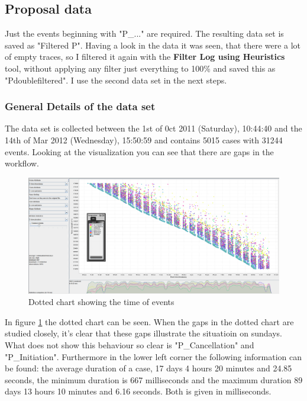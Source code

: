 \subsection{Proposal data}
Just the events beginning with "P\_..." are required. The resulting data set is saved as "Filtered P". Having a look in the data it was seen, that there were a lot of empty traces, so I filtered it again with the \textbf{Filter Log using Heuristics} tool, without applying any filter just everything to 100\% and saved this as "Pdoublefiltered". I use the second data set in the next steps.

\subsubsection{General Details of the data set}
The data set is collected between the 1st of 0ct 2011 (Saturday), 10:44:40 and the 14th of Mar 2012 (Wednesday), 15:50:59 and contains 5015 cases with 31244 events. Looking at the visualization you can see that there are gaps in the workflow. 

\begin{figure}[!htbp]
\centering
\includegraphics[height = 0.2\textheight]{ProposalData.PNG}
\caption{Dotted chart showing the time of events}
\label{fig:PropTimeFlow}
\end{figure}

In figure \ref{fig:PropTimeFlow} the dotted chart can be seen. When the gaps in the dotted chart are studied closely, it's clear that these gaps illustrate the situatioin on sundays. What does not show this behaviour so clear is "P\_Cancellation" and "P\_Initiation". Furthermore in the lower left corner the following information can be found: the average duration of a case, 17 days 4 hours 20 minutes and 24.85 seconds, the minimum duration is 667 milliseconds and the maximum duration 89 days 13 hours 10 minutes and 6.16 seconds. Both is given in milliseconds.

